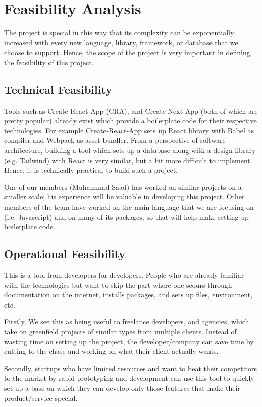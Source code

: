 \section{Feasibility Analysis}
The project is special in this way that its complexity can be exponentially increased with every new language, library, framework, or database that we choose to support. Hence, the scope of the project is very important in defining the feasibility of this project.

\subsection{Technical Feasibility}
Tools such as Create-React-App (CRA), and Create-Next-App (both of which are pretty popular) already exist which provide a boilerplate code for their respective technologies. For example Create-React-App sets up React library with Babel as compiler and Webpack as asset bundler. From a perspective of software architecture, building a tool which sets up a database along with a design library (e.g. Tailwind) with React is very similar, but a bit more difficult to implement. Hence, it is technically practical to build such a project.

One of our members (Muhammad Saad) has worked on similar projects on a smaller scale; his experience will be valuable in developing this project. Other members of the team have worked on the main language that we are focusing on (i.e. Javascript) and on many of its packages, so that will help make setting up boilerplate code.

\subsection{Operational Feasibility}
This is a tool from developers for developers. People who are already familiar with the technologies but want to skip the part where one scours through documentation on the internet, installs packages, and sets up files, environment, etc.

Firstly, We see this as being useful to freelance developers, and agencies, which take on greenfield projects of similar types from multiple clients. Instead of wasting time on setting up the project, the developer/company can save time by cutting to the chase and working on what their client actually wants.

Secondly, startups who have limited resources and want to beat their competitors to the market by rapid prototyping and development can use this tool to quickly set up a base on which they can develop only those features that make their product/service special.


